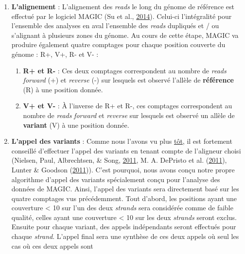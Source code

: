 \documentclass[12pt,twoside]{reedthesis}
\providecommand{\tightlist}{%
  \setlength{\itemsep}{0pt}\setlength{\parskip}{0pt}}
\theoremstyle{definition}
\theoremstyle{definition}
\theoremstyle{remark}
\begin{document}
  \begin{enumerate}
  \def\labelenumi{\arabic{enumi}.}
  \tightlist
  \item
    \textbf{L'alignement} : L'alignement des \emph{reads} le long du
    génome de référence est effectué par le logiciel MAGIC (Su et al.,
    \protect\hyperlink{ref-Su2014}{2014}). Celui-ci l'intégralité pour
    l'ensemble des analyses en aval l'ensemble des \emph{reads} dupliqués
    et / ou s'alignant à plusieurs zones du génome. Au cours de cette
    étape, MAGIC va produire également quatre comptages pour chaque
    position couverte du génome : R+, V+, R- et V- :
  
    \begin{enumerate}
    \def\labelenumii{\alph{enumii}.}
    \tightlist
    \item
      \textbf{R+ et R-} : Ces deux comptages correspondent au nombre de
      \emph{reads} \emph{forward} (+) et \emph{reverse} (-) sur lesquels
      est observé l'allèle de \textbf{référence} (R) à une position
      donnée.\\
    \item
      \textbf{V+ et V-} : À l'inverse de R+ et R-, ces comptages
      correspondent au nombre de \emph{reads} \emph{forward} et
      \emph{reverse} sur lesquels est observé un allèle de
      \textbf{variant} (V) à une position donnée.\\
    \end{enumerate}
  \item
    \textbf{L'appel des variants} : Comme nous l'avons vu plus
    \protect\hyperlink{varcall}{tôt}, il est fortement conseillé
    d'effectuer l'appel des variants en tenant compte de l'aligneur choisi
    (Nielsen, Paul, Albrechtsen, \& Song,
    \protect\hyperlink{ref-Nielsen2011}{2011}, M. A. DePristo et al.
    (\protect\hyperlink{ref-DePristo2011}{2011}), Lunter \& Goodson
    (\protect\hyperlink{ref-Lunter2011}{2011})). C'est pourquoi, nous
    avons conçu notre propre algorithme d'appel des variants spécialement
    conçu pour l'analyse des données de MAGIC. Ainsi, l'appel des variants
    sera directement basé sur les quatre comptages vus précédemment. Tout
    d'abord, les positions ayant une couverture \textless{} 10 sur l'un
    des deux \emph{strands} sera considérée comme de faible qualité,
    celles ayant une couverture \textless{} 10 sur les deux \emph{strands}
    seront exclus. Ensuite pour chaque variant, des appels indépendants
    seront effectués pour chaque \emph{strand}. L'appel final sera une
    synthèse de ces deux appels où seul les cas où ces deux appels sont

\end{enumerate}
\end{document}
